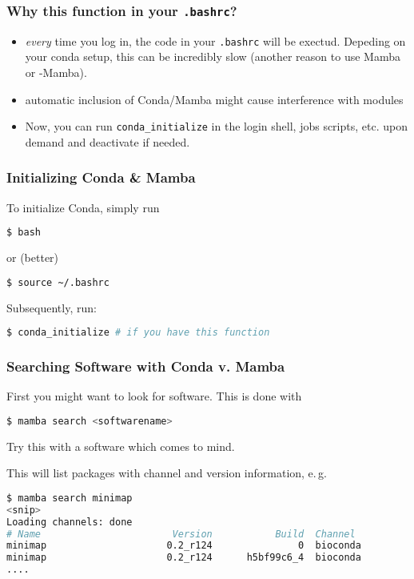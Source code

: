 \begin{frame}[fragile]
  \frametitle{Why this function in your \texttt{.bashrc}?}
  \begin{docs}
  	\begin{itemize}[<+->]
  		\item \emph{every} time you log in, the code in your \texttt{.bashrc} will be exectud. Depeding on your conda setup, this can be incredibly slow (another reason to use Mamba or \textmu-Mamba).
  		\item automatic inclusion of Conda/Mamba might cause interference with modules
  		\item Now, you can run \verb+conda_initialize+ in the login shell, jobs scripts, etc. upon demand and deactivate if needed.
  	\end{itemize}
  \end{docs}
\end{frame}

\begin{frame}[fragile]
  \frametitle{Initializing Conda \& Mamba}
  To initialize Conda, simply run
  \begin{lstlisting}[language=Bash, style=Shell]
$ bash
  \end{lstlisting}
  or (better)
  \begin{lstlisting}[language=Bash, style=Shell]
$ source ~/.bashrc
  \end{lstlisting}
  Subsequently, run: 
  \begin{lstlisting}[language=Bash, style=Shell]
$ conda_initialize # if you have this function
  \end{lstlisting}
\end{frame}



\begin{frame}[fragile]
  \frametitle{Searching Software with Conda v. Mamba}
  First you might want to look for software. This is done with
  \begin{lstlisting}[language=Bash, style=Shell]
$ mamba search <softwarename>
  \end{lstlisting}
  \pause
  \begin{task}
  	Try this with a software which comes to mind.
  \end{task}
  \pause
  This will list packages with channel and version information, e.\,g.
  \begin{lstlisting}[language=Bash, style=Shell, basicstyle=\tiny]
$ mamba search minimap
<snip>
Loading channels: done
# Name                       Version           Build  Channel             
minimap                     0.2_r124               0  bioconda            
minimap                     0.2_r124      h5bf99c6_4  bioconda
....
  \end{lstlisting}
\end{frame}


